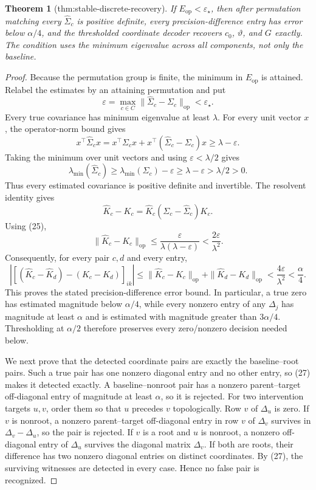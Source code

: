 \documentclass{article}
\newtheorem{theorem}{Theorem}
\begin{document}
\begin{theorem}[thm:stable-discrete-recovery]\label{thm:stable-discrete-recovery}
If \(E_{\mathrm{op}}<\varepsilon_{\star}\), then after permutation matching every \(\widehat\Sigma_c\) is positive definite, every precision-difference entry has error below \(\alpha/4\), and the thresholded coordinate decoder recovers \(c_0\), \(\vartheta\), and \(G\) exactly. The condition uses the minimum eigenvalue across all components, not only the baseline.
\end{theorem}
\begin{proof}
Because the permutation group is finite, the minimum in \(E_{\mathrm{op}}\)
is attained.  Relabel the estimates by an attaining permutation and put
\[
 \varepsilon=\max_{c\in C}
 \|\widehat\Sigma_c-\Sigma_c\|_{\mathrm{op}}
 <\varepsilon_\star .
\]
Every true covariance has minimum eigenvalue at least \(\lambda\).  For
every unit vector \(x\), the operator-norm bound gives
\[
 x^{\top}\widehat\Sigma_cx
 =x^{\top}\Sigma_cx+
   x^{\top}(\widehat\Sigma_c-\Sigma_c)x
 \ge\lambda-\varepsilon.
\]
Taking the minimum over unit vectors and using
\(\varepsilon<\lambda/2\) gives
\[
 \lambda_{\min}(\widehat\Sigma_c)
 \ge\lambda_{\min}(\Sigma_c)-\varepsilon
 \ge\lambda-\varepsilon>\lambda/2>0.                               \tag{25}
\]
Thus every estimated covariance is positive definite and invertible.
The resolvent identity gives
\[
 \widehat K_c-K_c
 =\widehat K_c(\Sigma_c-\widehat\Sigma_c)K_c.
\]
Using (25),
\[
 \|\widehat K_c-K_c\|_{\mathrm{op}}
 \le\frac{\varepsilon}{\lambda(\lambda-\varepsilon)}
 <\frac{2\varepsilon}{\lambda^2}.                                 \tag{26}
\]
Consequently, for every pair \(c,d\) and every entry,
\[
 \left|
 [(\widehat K_c-\widehat K_d)-(K_c-K_d)]_{ik}
 \right|
 \le\|\widehat K_c-K_c\|_{\mathrm{op}}
    +\|\widehat K_d-K_d\|_{\mathrm{op}}
 <\frac{4\varepsilon}{\lambda^2}
 <\frac{\alpha}{4}.                                                \tag{27}
\]
This proves the stated precision-difference error bound.  In particular,
a true zero has estimated magnitude below \(\alpha/4\), while every
nonzero entry of any \(\Delta_j\) has magnitude at least \(\alpha\) and
is estimated with magnitude greater than \(3\alpha/4\).  Thresholding at
\(\alpha/2\) therefore preserves every zero/nonzero decision needed below.

We next prove that the detected coordinate pairs are exactly the
baseline--root pairs.  Such a true pair has one nonzero diagonal entry
and no other entry, so (27) makes it detected exactly.  A
baseline--nonroot pair has a nonzero parent--target off-diagonal entry of
magnitude at least \(\alpha\), so it is rejected.  For two intervention
targets \(u,v\), order them so that \(u\) precedes \(v\) topologically.
Row \(v\) of \(\Delta_u\) is zero.  If \(v\) is nonroot, a nonzero
parent--target off-diagonal entry in row \(v\) of \(\Delta_v\) survives in
\(\Delta_v-\Delta_u\), so the pair is rejected.  If \(v\) is a root and
\(u\) is nonroot, a nonzero off-diagonal entry of \(\Delta_u\) survives
the diagonal matrix \(\Delta_v\).  If both are roots, their difference
has two nonzero diagonal entries on distinct coordinates.  By (27), the
surviving witnesses are detected in every case.  Hence no false pair is
recognized.


\end{proof}
\end{document}
